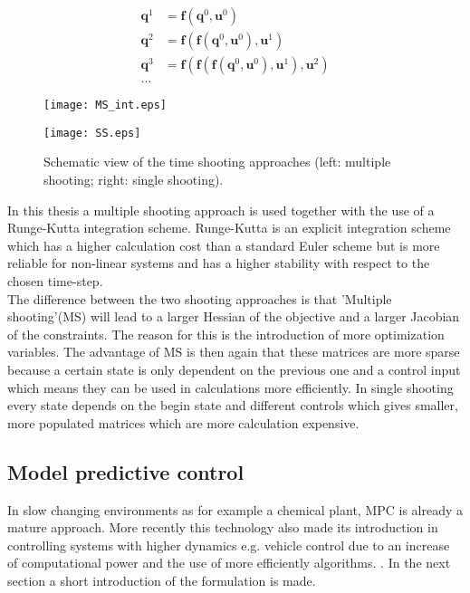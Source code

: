 \begin{enumerate}
	\begin{equation}\label{eq:2}
	\begin{aligned}
	\bm{q}^1 &= \bm{f}(\bm{q}^0, \bm{u}^0)\\
	\bm{q}^2 &= \bm{f}(\bm{f}(\bm{q}^0, \bm{u}^0), \bm{u}^1)\\
	\bm{q}^3 &= \bm{f}(\bm{f}(\bm{f}(\bm{q}^0, \bm{u}^0), \bm{u}^1), \bm{u}^2)\\
	...
	\end{aligned}
	\end{equation}
\end{enumerate}

\begin{figure}[htp]
	\centering
	\begin{minipage}{0.49\textwidth}
		\centering
		\texttt{[image: MS\_int.eps]}
	\end{minipage}
	\hfill
	\begin{minipage}{.49\textwidth}
		\centering
		\texttt{[image: SS.eps]}
	\end{minipage}
	\caption{Schematic view of the time shooting approaches (left: multiple shooting; right: single shooting).}
	\label{fig:TS}
\end{figure}

In this thesis a multiple shooting approach is used together with the use of a Runge-Kutta integration scheme. Runge-Kutta is an explicit integration scheme which has a higher calculation cost than a standard Euler scheme but is more reliable for non-linear systems and has a higher stability with respect to the chosen time-step. \cite{Mercy2018}  \\ 

The difference between the two shooting approaches is that 'Multiple shooting'(MS) will lead to a larger Hessian of the objective and a larger Jacobian of the constraints. The reason for this is the introduction of more optimization variables. The advantage of MS is then again that these matrices are more sparse because a certain state is only dependent on the previous one and a control input which means they can be used in calculations more efficiently. In single shooting every state depends on the begin state and different controls which gives smaller, more populated matrices which are more calculation expensive. \cite{Gillis2019}

\subsection{Model predictive control}
In slow changing environments as for example a chemical plant, MPC is already a mature approach. More recently this technology also made its introduction in controlling systems with higher dynamics e.g. vehicle control due to an increase of computational power and the use of more efficiently algorithms. \cite{Mercy2018}. In the next section a short introduction of the formulation is made. \\

